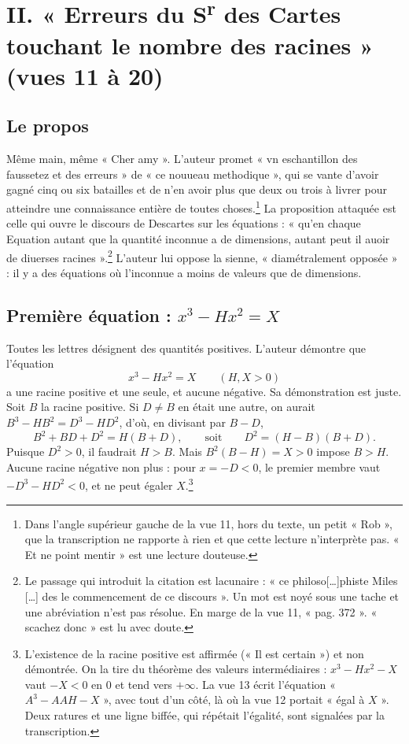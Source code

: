 \documentclass[11pt,a4paper]{article}
\begin{document}
\section*{II. « Erreurs du S\textsuperscript{r} des Cartes touchant le nombre des racines » (vues 11 à 20)}

\subsection*{Le propos}

Même main, même « Cher amy ». L'auteur promet « vn eschantillon des faussetez
et des erreurs » de « ce nouueau methodique », qui se vante d'avoir gagné cinq
ou six batailles et de n'en avoir plus que deux ou trois à livrer pour
atteindre une connaissance entière de toutes choses.\footnote{Dans l'angle
supérieur gauche de la vue 11, hors du texte, un petit « Rob », que la
transcription ne rapporte à rien et que cette lecture n'interprète pas. « Et
ne point mentir » est une lecture douteuse.} La proposition attaquée est
celle qui ouvre le discours de Descartes sur les équations : « qu'en chaque
Equation autant que la quantité inconnue a de dimensions, autant peut il auoir
de diuerses racines ».\footnote{Le passage qui introduit la citation est
lacunaire : « ce philoso[\ldots]phiste Miles [\ldots] des le commencement de ce
discours ». Un mot est noyé sous une tache et une abréviation n'est pas
résolue. En marge de la vue 11, « pag. 372 ». « scachez donc » est lu avec
doute.} L'auteur lui oppose la sienne, « diamétralement opposée » : il y a des
équations où l'inconnue a moins de valeurs que de dimensions.

\subsection*{Première équation : \(x^3-Hx^2=X\)}

Toutes les lettres désignent des quantités positives. L'auteur démontre que
l'équation
\[
x^3-Hx^2=X \qquad (H,X>0)
\]
a une racine positive et une seule, et aucune négative. Sa démonstration est
juste. Soit \(B\) la racine positive. Si \(D\neq B\) en était une autre, on
aurait \(B^3-HB^2=D^3-HD^2\), d'où, en divisant par \(B-D\),
\[
B^2+BD+D^2=H(B+D), \qquad\text{soit}\qquad D^2=(H-B)(B+D).
\]
Puisque \(D^2>0\), il faudrait \(H>B\). Mais \(B^2(B-H)=X>0\) impose \(B>H\).
Aucune racine négative non plus : pour \(x=-D<0\), le premier membre vaut
\(-D^3-HD^2<0\), et ne peut égaler \(X\).\footnote{L'existence de la racine
positive est affirmée (« Il est certain ») et non démontrée. On la tire du
théorème des valeurs intermédiaires : \(x^3-Hx^2-X\) vaut \(-X<0\) en \(0\) et
tend vers \(+\infty\). La vue 13 écrit l'équation « \(A^3-AAH-X\) », avec
tout d'un côté, là où la vue 12 portait « égal à \(X\) ». Deux ratures et une
ligne biffée, qui répétait l'égalité, sont signalées par la
transcription.}
\end{document}
